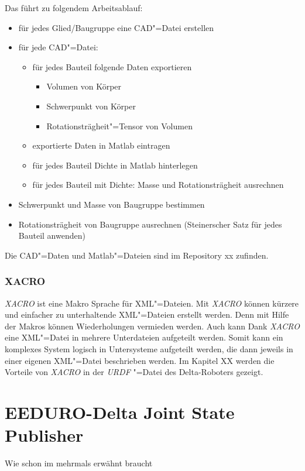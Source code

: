 Das führt zu folgendem Arbeitsablauf:
\begin{itemize}
\item für jedes Glied/Baugruppe eine CAD"=Datei erstellen
\item für jede CAD"=Datei:
\begin{itemize}
\item für jedes Bauteil folgende Daten exportieren
\begin{itemize}
\item Volumen von Körper
\item Schwerpunkt von Körper
\item Rotationsträgheit"=Tensor von Volumen
\end{itemize}
\item exportierte Daten in Matlab eintragen
\item für jedes Bauteil Dichte in Matlab hinterlegen
\item für jedes Bauteil mit Dichte: Masse und Rotationsträgheit ausrechnen  
\end{itemize}
\item Schwerpunkt und Masse von Baugruppe bestimmen
\item Rotationsträgheit von Baugruppe ausrechnen (Steinerscher Satz für jedes Bauteil anwenden)
\end{itemize}

Die CAD"=Daten und Matlab"=Dateien sind im Repository xx zufinden.

\subsubsection{XACRO}
\label{chap:xacro}
\textit{XACRO} ist eine Makro Sprache für XML"=Dateien. %
Mit \textit{XACRO} können kürzere und einfacher zu unterhaltende XML"=Dateien erstellt werden.
Denn mit Hilfe der Makros können Wiederholungen vermieden werden.
Auch kann Dank \textit{XACRO} eine XML"=Datei in mehrere Unterdateien aufgeteilt werden.
Somit kann ein komplexes System logisch in Untersysteme aufgeteilt werden, die dann jeweils in einer eigenen XML"=Datei beschrieben werden. 
Im Kapitel XX werden die Vorteile von \textit{XACRO} in der \textit{URDF} "=Datei des Delta-Roboters gezeigt.



\section{EEDURO-Delta Joint State Publisher}
Wie schon im mehrmals erwähnt braucht %



